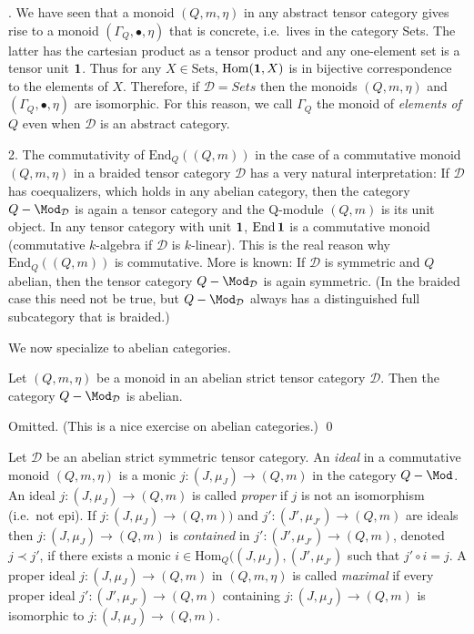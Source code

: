 \documentclass[12pt]{article}
\theoremstyle{definition}
\theoremstyle{definition}
\theoremstyle{remark}
\def\2#1{{\mathcal #1}}
\def\1#1{{\bf #1}}
\newcommand{\Hom}{\mathrm{Hom}}
\newcommand{\End}{\mathrm{End}}
\newcommand{\mcirc}{\circ}
\newcommand{\rarr}{\rightarrow}
\begin{document}
. We have seen that a monoid $(Q,m,\eta)$ in any abstract tensor category gives rise to a
monoid $(\Gamma_Q,\bullet,\eta)$ that is concrete, i.e.\ lives in the category Sets. The latter has
the cartesian product as a tensor product and any one-element set is a tensor unit $\11$. Thus for
any $X\in\mathrm{Sets}$, $\Hom(\11,X)$ is in bijective correspondence to the elements of
$X$. Therefore, if $\2D=Sets$ then the monoids $(Q,m,\eta)$ and $(\Gamma_Q,\bullet,\eta)$ are
isomorphic. For this reason, we call $\Gamma_Q$ the monoid of \emph{elements of $Q$} even when $\2D$
is an abstract category. 

2. The commutativity of $\End_Q((Q,m))$ in the case of a commutative monoid $(Q,m,\eta)$ in a
braided tensor category $\2D$ has a very natural interpretation: If $\2D$ has coequalizers, which
holds in any abelian category, then the category $Q-\Mod_\2D$ is again a tensor category and the
Q-module $(Q,m)$ is its unit object. In any tensor category with unit $\11$, $\End\,\11$ is a
commutative monoid  (commutative $k$-algebra if $\2D$ is $k$-linear). This is the real reason why
$\End_Q((Q,m))$ is commutative. 
More is known: If $\2D$ is symmetric and $Q$ abelian, then the tensor category $Q-\Mod_\2D$ is again
symmetric. (In the braided case this need not be true, but $Q-\Mod_\2D$ always has a distinguished
full subcategory that is braided.)
\erem

We now specialize to abelian categories.

\bprop
Let $(Q,m,\eta)$ be a monoid in an abelian strict tensor category $\2D$. Then the category
$Q-\Mod_\2D$ is abelian.
\eprop

\prf Omitted. (This is a nice exercise on abelian categories.)
\qed

\bdefin {}
Let $\2D$ be an abelian strict symmetric tensor category.
An \emph{ideal} in a commutative monoid $(Q,m,\eta)$ is a monic $j:(J,\mu_J)\rarr(Q,m)$ in the
category $Q-\Mod$. An ideal $j:(J,\mu_J)\rarr(Q,m)$ is called \emph{proper} if $j$ is not an
isomorphism (i.e.\ not epi). If $j:(J,\mu_J)\rarr(Q,m))$ and $j':(J',\mu_{J'})\rarr(Q,m)$ are ideals
then $j:(J,\mu_J)\rarr(Q,m)$ is \emph{contained} in $j':(J',\mu_{J'})\rarr(Q,m)$, denoted
$j\prec j'$, if there exists a monic $i\in\Hom_Q((J,\mu_J),(J',\mu_{J'})$ such that $j'\mcirc i=j$. 
A proper ideal $j:(J,\mu_J)\rarr(Q,m)$ in $(Q,m,\eta)$ is called \emph{maximal} if every proper
ideal $j':(J',\mu_{J'})\rarr(Q,m)$ containing $j:(J,\mu_J)\rarr(Q,m)$ is isomorphic to
$j:(J,\mu_J)\rarr(Q,m)$.  
\edefin
\end{document}
